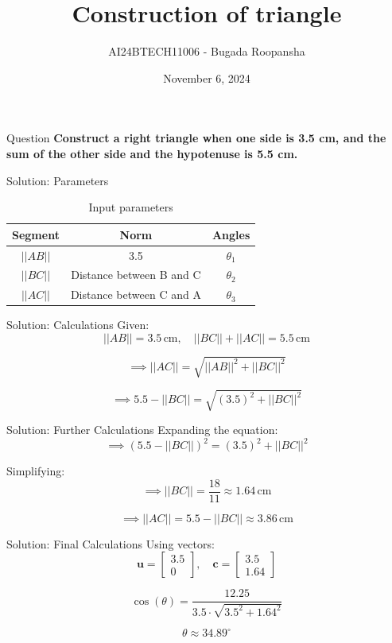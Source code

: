\documentclass{beamer}
\title{Construction of triangle}
\author{AI24BTECH11006 - Bugada Roopansha}
\institute{IIT Hyderabad}
\date{November 6, 2024}
\begin{document}
\begin{frame}
    \titlepage
\end{frame}

\begin{frame}{Question}
    \textbf{Construct a right triangle when one side is 3.5 cm, and the sum of the other side and the hypotenuse is 5.5 cm.}
    
\end{frame}

\begin{frame}{Solution: Parameters}
    \begin{table}[h!]
        \centering
        \begin{tabular}{|c|c|c|}
            \hline
            \textbf{Segment} & \textbf{Norm} & \textbf{Angles} \\ \hline
            \( ||AB|| \) & 3.5 & $\theta_1$ \\ \hline
            \( ||BC|| \) & Distance between B and C & $\theta_2$ \\ \hline
            \( ||AC|| \) & Distance between C and A & $\theta_3$ \\ \hline
        \end{tabular}
        \caption{Input parameters}
    \end{table}
\end{frame}

\begin{frame}{Solution: Calculations}
    Given:
    \[
    ||AB|| = 3.5 \, \text{cm}, \quad ||BC|| + ||AC|| = 5.5 \, \text{cm}
    \]
    
    \[
    \implies ||AC|| = \sqrt{||AB||^2 + ||BC||^2}
    \]
    
    \[
    \implies 5.5 - ||BC|| = \sqrt{(3.5)^2 + ||BC||^2}
    \]
\end{frame}

\begin{frame}{Solution: Further Calculations}
    Expanding the equation:
    \[
    \implies (5.5 - ||BC||)^2 = (3.5)^2 + ||BC||^2
    \]
    
    Simplifying:
    \[
    \implies ||BC|| = \frac{18}{11} \approx 1.64 \, \text{cm}
    \]
    
    \[
    \implies ||AC|| = 5.5 - ||BC|| \approx 3.86 \, \text{cm}
    \]
\end{frame}

\begin{frame}{Solution: Final Calculations}
    Using vectors:
    \[
    \mathbf{u} = \begin{bmatrix} 3.5 \\ 0 \end{bmatrix}, \quad \mathbf{c} = \begin{bmatrix} 3.5 \\ 1.64 \end{bmatrix}
    \]
    
    \[
    \cos(\theta) = \frac{12.25}{3.5 \cdot \sqrt{3.5^2 + 1.64^2}}
    \]
    
    \[
    \theta \approx 34.89^\circ
    \]
\end{frame}
\end{document}
